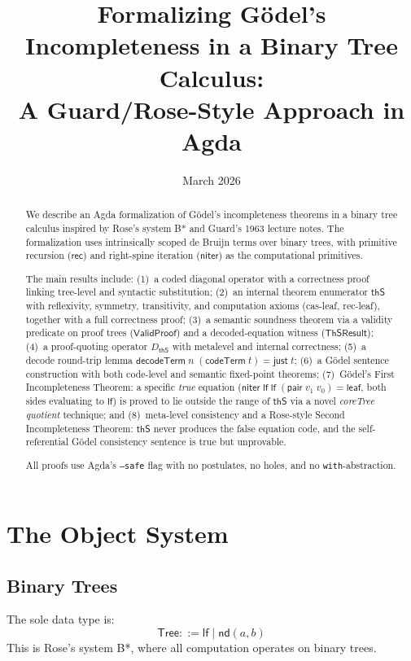 \documentclass[11pt]{article}
\title{Formalizing G\"odel's Incompleteness in a Binary Tree Calculus:\\
  A Guard/Rose-Style Approach in Agda}
\author{}
\date{March 2026}
\newcommand{\lf}{\mathsf{lf}}
\newcommand{\nd}{\mathsf{nd}}
\newcommand{\rec}{\mathsf{rec}}
\newcommand{\niter}{\mathsf{niter}}
\newcommand{\codeTerm}{\mathsf{codeTerm}}
\newcommand{\decodeTerm}{\mathsf{decodeTerm}}
\newcommand{\thS}{\mathsf{thS}}
\newcommand{\Tree}{\mathsf{Tree}}
\newcommand{\dThS}{D_{\thS}}
\newcommand{\ValidProof}{\mathsf{ValidProof}}
\newcommand{\ThSResult}{\mathsf{ThSResult}}
\begin{document}
\maketitle

\begin{abstract}
We describe an Agda formalization of G\"odel's incompleteness theorems
in a binary tree calculus inspired by Rose's system B* and Guard's 1963 lecture
notes. The formalization uses intrinsically scoped de Bruijn terms over binary
trees, with primitive recursion ($\rec$) and right-spine iteration ($\niter$) as
the computational primitives.

The main results include: (1)~a coded diagonal operator with a
correctness proof linking tree-level and syntactic substitution; (2)~an
internal theorem enumerator $\thS$ with reflexivity, symmetry, transitivity,
and computation axioms (cas-leaf, rec-leaf),
together with a full correctness proof; (3)~a semantic soundness theorem
via a validity predicate on proof trees ($\ValidProof$) and a decoded-equation
witness ($\ThSResult$); (4)~a proof-quoting operator $\dThS$ with metalevel
and internal correctness; (5)~a decode round-trip lemma
$\decodeTerm\;n\;(\codeTerm\;t) = \mathsf{just}\;t$; (6)~a G\"odel
sentence construction with both code-level and semantic fixed-point theorems;
(7)~G\"odel's First Incompleteness Theorem: a specific \emph{true} equation
($\niter\;\lf\;\lf\;(\mathsf{pair}\;v_1\;v_0) = \mathsf{leaf}$, both sides
evaluating to $\lf$) is proved to lie outside the range of $\thS$ via a novel
\emph{coreTree quotient} technique; and (8)~meta-level consistency and a
Rose-style Second Incompleteness Theorem: $\thS$ never produces the false
equation code, and the self-referential G\"odel consistency sentence is true
but unprovable.

All proofs use Agda's \texttt{--safe} flag with no postulates, no holes,
and no \texttt{with}-abstraction.
\end{abstract}

\section{The Object System}

\subsection{Binary Trees}

The sole data type is:
\[
  \Tree ::= \lf \mid \nd(a, b)
\]
This is Rose's system B*, where all computation operates on binary trees.
\end{document}
